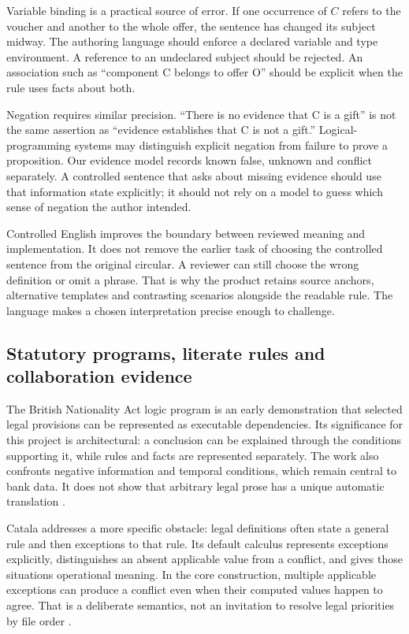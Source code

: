 \documentclass[12pt,a4paper,oneside,openany]{book}
\begin{document}
Variable binding is a practical source of error. If one occurrence of $C$
refers to the voucher and another to the whole offer, the sentence has changed
its subject midway. The authoring language should enforce a declared variable
and type environment. A reference to an undeclared subject should be rejected.
An association such as ``component C belongs to offer O'' should be explicit
when the rule uses facts about both.

Negation requires similar precision. ``There is no evidence that C is a gift''
is not the same assertion as ``evidence establishes that C is not a gift.''
Logical-programming systems may distinguish explicit negation from failure to
prove a proposition. Our evidence model records known false, unknown and
conflict separately. A controlled sentence that asks about missing evidence
should use that information state explicitly; it should not rely on a model
to guess which sense of negation the author intended.

Controlled English improves the boundary between reviewed meaning and
implementation. It does not remove the earlier task of choosing the controlled
sentence from the original circular. A reviewer can still choose the wrong
definition or omit a phrase. That is why the product retains source anchors,
alternative templates and contrasting scenarios alongside the readable rule.
The language makes a chosen interpretation precise enough to challenge.

\subsection{Statutory programs, literate rules and collaboration evidence}
\label{merge:P-02-literature:02}


The British Nationality Act logic program is an early demonstration that selected
legal provisions can be represented as executable dependencies. Its significance
for this project is architectural: a conclusion can be explained through the
conditions supporting it, while rules and facts are represented separately.
The work also confronts negative information and temporal conditions, which
remain central to bank data. It does not show that arbitrary legal prose has a
unique automatic translation \citep{sergot1986}.

Catala addresses a more specific obstacle: legal definitions often state a
general rule and then exceptions to that rule. Its default calculus represents
exceptions explicitly, distinguishes an absent applicable value from a conflict,
and gives those situations operational meaning. In the core construction,
multiple applicable exceptions can produce a conflict even when their computed
values happen to agree. That is a deliberate semantics, not an invitation to
resolve legal priorities by file order \citep[secs.~3--4]{catala2021}.
\end{document}

